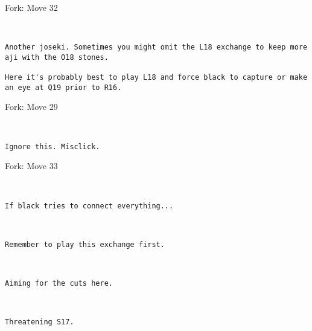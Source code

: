 \documentclass[twocolumn]{article}
\begin{document}
\begin{subsection}{Fork: Move 32}
\begin{center}
\cleargoban
{}
\showfullgoban
\\\begin{lstlisting}
Another joseki. Sometimes you might omit the L18 exchange to keep more aji with the O18 stones.

Here it's probably best to play L18 and force black to capture or make an eye at Q19 prior to R16.\end{lstlisting}
\end{center}
\end{subsection}
\begin{subsection}{Fork: Move 29}
\begin{center}
\cleargoban
{}
\showfullgoban
\\\begin{lstlisting}
Ignore this. Misclick.\end{lstlisting}
\end{center}
\end{subsection}
\begin{subsection}{Fork: Move 33}
\begin{center}
\cleargoban
{}
\showfullgoban
\\\begin{lstlisting}
If black tries to connect everything...\end{lstlisting}
\end{center}
\begin{center}
\cleargoban
{}
\showfullgoban
\\\begin{lstlisting}
Remember to play this exchange first.\end{lstlisting}
\end{center}
\begin{center}
\cleargoban
{}
\showfullgoban
\\\begin{lstlisting}
Aiming for the cuts here.\end{lstlisting}
\end{center}
\begin{center}
\cleargoban
{}
\showfullgoban
\\\begin{lstlisting}
Threatening S17.\end{lstlisting}
\end{center}
\end{subsection}
\end{document}
